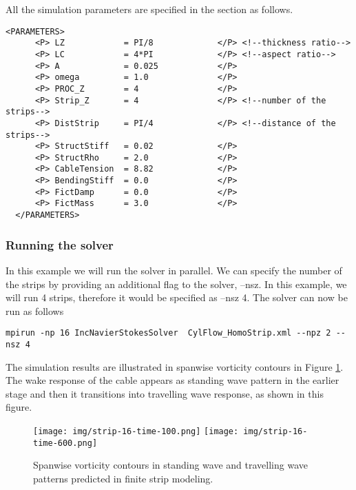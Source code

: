 All the simulation parameters are specified in the section as follows.

    \begin{lstlisting}[style=XMLStyle]
  <PARAMETERS>
      <P> LZ            = PI/8             </P> <!--thickness ratio-->
      <P> LC            = 4*PI             </P> <!--aspect ratio-->
      <P> A             = 0.025            </P>
      <P> omega         = 1.0              </P>
      <P> PROC_Z        = 4                </P>
      <P> Strip_Z       = 4                </P> <!--number of the strips-->
      <P> DistStrip     = PI/4             </P> <!--distance of the strips-->
      <P> StructStiff   = 0.02             </P>  
      <P> StructRho     = 2.0              </P>
      <P> CableTension  = 8.82             </P>
      <P> BendingStiff  = 0.0              </P>
      <P> FictDamp      = 0.0              </P>
      <P> FictMass      = 3.0              </P>
  </PARAMETERS>
     \end{lstlisting}    

\subsubsection{Running the solver}
In this example we will run the solver in parallel. We can specify the number of the strips by providing an additional flag to the solver, –nsz. In this example, we will run 4 strips, therefore it would be specified as –nsz 4. The solver can now be run as follows    

\begin{lstlisting}[style=BashInputStyle]
mpirun -np 16 IncNavierStokesSolver  CylFlow_HomoStrip.xml --npz 2 --nsz 4
\end{lstlisting}

The simulation results are illustrated in spanwise vorticity contours in Figure \ref{f:incns:finite-strip-modeling}. The wake response of the cable appears as standing wave pattern in the earlier stage and then it transitions into travelling wave response, as shown in this figure.  

\begin{figure}
\begin{center}
\texttt{[image: img/strip-16-time-100.png]}
\texttt{[image: img/strip-16-time-600.png]}
\caption{Spanwise vorticity contours in standing wave and travelling wave patterns predicted in finite strip modeling.}
\label{f:incns:finite-strip-modeling}
\end{center}
\end{figure}

